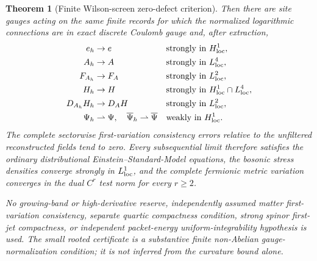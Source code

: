 \documentclass[11pt]{article}
\numberwithin{equation}{section}
\newtheorem{theorem}{Theorem}[section]
\theoremstyle{definition}
\theoremstyle{remark}
\newcommand{\bPsi}{\overline\Psi}
\begin{document}
\begin{theorem}[Finite Wilson-screen zero-defect criterion]
Then there are site gauges acting on the same finite records for which the
normalized logarithmic connections are in exact discrete Coulomb gauge and,
after extraction,
\begin{align}
 e_h&\to e &&\text{strongly in }H^1_{\rm loc},\notag\\
 A_h&\to A &&\text{strongly in }L^4_{\rm loc},\notag\\
 F_{A_h}&\to F_A &&\text{strongly in }L^2_{\rm loc},\notag\\
 H_h&\to H &&\text{strongly in }H^1_{\rm loc}\cap L^4_{\rm loc},\notag\\
 D_{A_h}H_h&\to D_AH &&\text{strongly in }L^2_{\rm loc},\notag\\
 \Psi_h&\rightharpoonup\Psi,
 \quad\bPsi_h\rightharpoonup\bPsi &&\text{weakly in }H^1_{\rm loc}.
 \label{eq:Wilson-strong-convergence}
\end{align}
The complete sectorwise first-variation consistency errors relative to the
unfiltered reconstructed fields tend to zero.  Every subsequential limit
therefore satisfies the ordinary distributional Einstein--Standard-Model
equations, the bosonic stress densities converge strongly in $L^1_{\rm loc}$,
and the complete fermionic metric variation converges in the dual $C^r$ test
norm for every $r\ge2$.

No growing-band or high-derivative reserve, independently assumed matter
first-variation consistency, separate quartic compactness condition, strong
spinor first-jet compactness, or independent packet-energy
uniform-integrability hypothesis is used.  The small rooted certificate is a
substantive finite non-Abelian gauge-normalization condition; it is not
inferred from the curvature bound alone.
\end{theorem}
\end{document}
